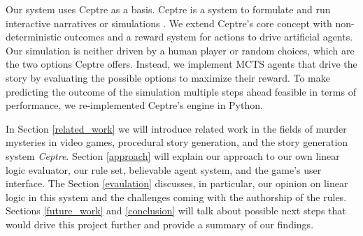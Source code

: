 Our system uses Ceptre as a basis. Ceptre is a system to formulate and run interactive narratives or simulations \cite{martens_2015}.
We extend Ceptre's core concept with non-deterministic outcomes and a reward system for actions to drive artificial agents.
Our simulation is neither driven by a human player or random choices, which are the two options Ceptre offers.
Instead, we implement MCTS agents that drive the story by evaluating the possible options to maximize their reward.
To make predicting the outcome of the simulation multiple steps ahead feasible in terms of performance, we re-implemented Ceptre's engine in Python.

In Section \ref{related_work} we will introduce related work in the fields of murder mysteries in video games, procedural story generation, and the story generation system \emph{Ceptre}.
Section \ref{approach} will explain our approach to our own linear logic evaluator, our rule set, believable agent system, and the game's user interface.
The Section \ref{evaulation} discusses, in particular, our opinion on linear logic in this system and the challenges coming with the authorship of the rules.
Sections \ref{future_work} and \ref{conclusion} will talk about possible next steps that would drive this project further and provide a summary of our findings.

